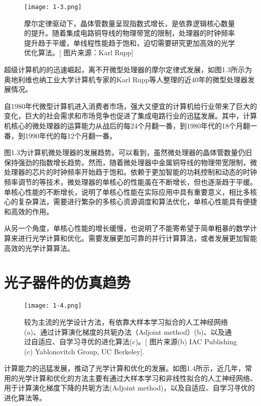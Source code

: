 \begin{figure}[!htbp]
    \centering
    \texttt{[image: 1-3.png]}
    \caption{摩尔定律驱动下，晶体管数量呈现指数式增长，是依靠逻辑核心数量的提升。随着集成电路铜导线的物理带宽的限制，处理器的时钟频率提升趋于平缓，单线程性能趋于饱和，迫切需要研究更加高效的光学优化算法。[{\color[HTML]{0000FF} 图片来源：Karl Rupp}]}
    \label{fig:1-3}
\end{figure}

超级计算机的的迅速崛起，离不开微型处理器的摩尔定律式发展，如图1.3所示为奥地利维也纳工业大学计算机专家的Karl Rupp等人整理的近40年的微型处理器发展情况。

自1980年代微型计算机进入消费者市场，强大又便宜的计算机给行业带来了巨大的变化，巨大的社会需求和市场竞争也促进了集成电路行业的迅猛发展。其中，计算机核心的微处理器的运算能力从战后的每24个月翻一番，到1980年代的18个月翻一番，到1990年代的每12个月翻一番。\cite{42years}

图1.3为计算机微处理器的发展趋势。可以看到，虽然微处理器的晶体管数量仍旧保持强劲的指数增长趋势。然而，随着微处理器中金属铜导线的物理带宽限制，微处理器的芯片的时钟频率开始趋于饱和。依赖于更加智能的功耗控制和动态的时钟频率调节的等技术，微处理器的单核心的性能虽在不断增长，但也逐渐趋于平缓。单核心性能的不断增长，说明了单核心性能在实际应用中具有重要意义，相比多核心的复杂算法，需要进行繁杂的多核心资源调度和算法优化，单核心性能具有便捷和高效的作用。\cite{42yearsgit}

从另一个角度，单核心性能的增长缓慢，也说明了不能寄希望于简单粗暴的数学计算来进行光学计算和优化。需要发展更加可靠的并行计算算法，或者发展更加智能高效的光学计算算法。

\section{光子器件的仿真趋势}

\begin{figure}[!htbp]
    \centering
    \texttt{[image: 1-4.png]}
    \caption{较为主流的光学设计方法，有依靠大样本学习拟合的人工神经网络(a)、通过计算演化梯度的共轭办法（Adjoint method）(b)、以及通过自适应、自学习寻优的进化算法(c)。[{\color[HTML]{0000FF} 图片来源(b) IAC Publishing (c) Yablonovitch Group, UC Berkeley}].}
    \label{fig:1-4}
\end{figure}
计算能力的迅猛发展，推动了光学计算和优化的发展。如图1.4所示，近几年，常用的光学计算和优化的方法主要有通过大样本学习和非线性拟合的人工神经网络、用于计算演化梯度下降的共轭方法(Adjoint method)，以及自适应、自学习寻优的进化算法等。

